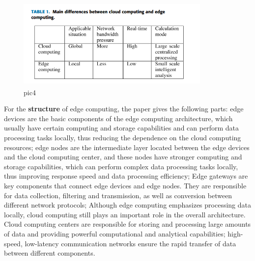 \documentclass[a4paper,twoside]{scrbook}
\begin{document}
\begin{CJK}{UTF8}{gbsn}
\begin{figure}
\centering %
\includegraphics[height=4.5cm,width=9.5cm]{edge1.png}
\caption{pic4}
\end{figure}
For the \textbf{structure} of edge computing, the paper gives the following parts: edge devices are the basic components of the edge computing architecture, which usually have certain computing and storage capabilities and can perform data processing tasks locally, thus reducing the dependence on the cloud computing resources; edge nodes are the intermediate layer located between the edge devices and the cloud computing center, and these nodes have stronger computing and storage capabilities, which can perform complex data processing tasks locally, thus improving response speed and data processing efficiency; Edge gateways are key components that connect edge devices and edge nodes. They are responsible for data collection, filtering and transmission, as well as conversion between different network protocols; Although edge computing emphasizes processing data locally, cloud computing still plays an important role in the overall architecture. Cloud computing centers are responsible for storing and processing large amounts of data and providing powerful computational and analytical capabilities; high-speed, low-latency communication networks ensure the rapid transfer of data between different components.



\end{CJK}
\end{document}
